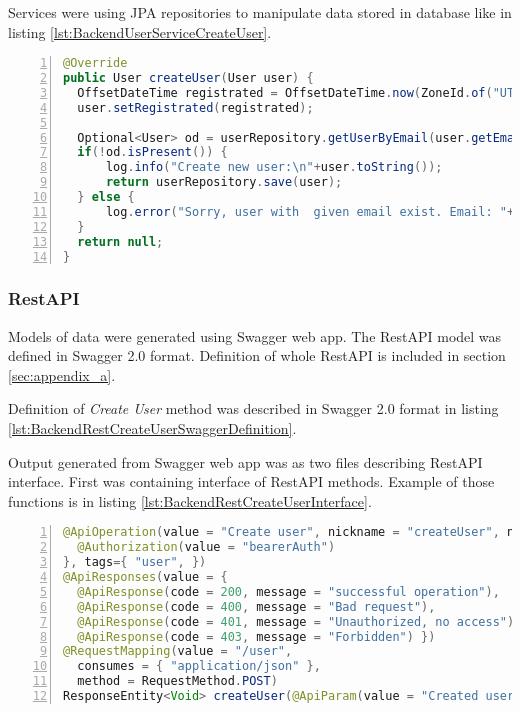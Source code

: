 Services were using JPA repositories to manipulate data stored in database like in listing \ref{lst:BackendUserServiceCreateUser}.
\begin{lstlisting}[breaklines=true, numbers=left, stepnumber=1, label={lst:BackendUserServiceCreateUser}, caption={User service create user},language=Java]
@Override
public User createUser(User user) {
  OffsetDateTime registrated = OffsetDateTime.now(ZoneId.of("UTC"));
  user.setRegistrated(registrated);
  
  Optional<User> od = userRepository.getUserByEmail(user.getEmail());
  if(!od.isPresent()) {
      log.info("Create new user:\n"+user.toString());
      return userRepository.save(user);
  } else {
      log.error("Sorry, user with  given email exist. Email: "+user.getEmail());
  }
  return null;
}	
\end{lstlisting}

\subsubsection{RestAPI}
Models of data were generated using Swagger web app. The RestAPI model was defined in Swagger 2.0 format. Definition of whole RestAPI is included in section \ref{sec:appendix_a}.

Definition of \textit{Create User} method was described in Swagger 2.0 format in listing \ref{lst:BackendRestCreateUserSwaggerDefinition}.



Output generated from Swagger web app was as two files describing RestAPI interface. First was containing interface of RestAPI methods. Example of those functions is in listing \ref{lst:BackendRestCreateUserInterface}.

\begin{lstlisting}[breaklines=true, numbers=left, stepnumber=1, label={lst:BackendRestCreateUserInterface}, caption={Create user interface generated by Swagger},language=Java]
  @ApiOperation(value = "Create user", nickname = "createUser", notes = "This can only be done by the logged in user.", authorizations = {
  @Authorization(value = "bearerAuth")
}, tags={ "user", })
@ApiResponses(value = { 
  @ApiResponse(code = 200, message = "successful operation"),
  @ApiResponse(code = 400, message = "Bad request"),
  @ApiResponse(code = 401, message = "Unauthorized, no access"),
  @ApiResponse(code = 403, message = "Forbidden") })
@RequestMapping(value = "/user",
  consumes = { "application/json" },
  method = RequestMethod.POST)
ResponseEntity<Void> createUser(@ApiParam(value = "Created user object" ,required=true )  @Valid @RequestBody User body,@ApiParam(value = "") @Valid @RequestParam(value = "token", required = false) String token);
\end{lstlisting}

